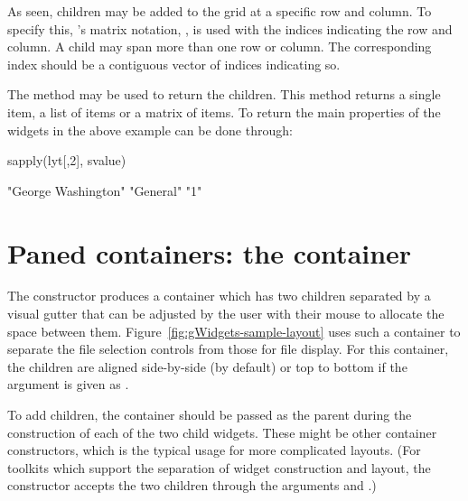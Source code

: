 As seen, children may be added to the grid at a specific row and
column. To specify this, \R's matrix notation, \code{[\ASSIGN}, is
used with the indices indicating the row and column.  A child may span
more than one row or column. The corresponding index should be a
contiguous vector of indices indicating so.  

The \code{[} method may be used to return the children. This method
returns a single item, a list of items or a matrix of items. To return
the main properties of the widgets in the above example can be done
through:
\begin{Schunk}
\begin{Sinput}
 sapply(lyt[,2], svalue)
\end{Sinput}
\begin{Soutput}
[1] "George Washington" "General"           "1"                
\end{Soutput}
\end{Schunk}





\section{Paned containers: the  container}
\label{sec:gWidgets-gpanedgroup-container}

The  constructor produces a container which
has two children separated by a visual gutter that can be
adjusted by the user with their mouse to allocate the space between them.
Figure~\ref{fig:gWidgets-sample-layout} uses such a
container to separate the file selection controls from those for file
display.  For this container, the children are aligned
side-by-side (by default) or top to bottom if the
 argument is given as
. 


To add children, the container should be passed as the parent during
the construction of each of the two child widgets.
These might be other container constructors, which
is the typical usage for more complicated layouts.
(For toolkits which support the separation of widget
construction and layout, the  constructor
accepts the two children through the arguments 
 and .)

